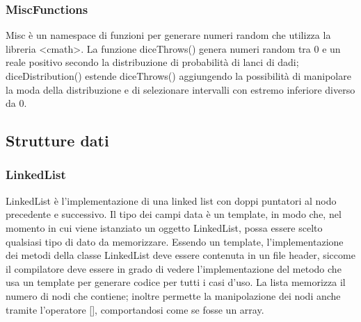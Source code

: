\documentclass[12pt]{article}
\begin{document}
\subsubsection{MiscFunctions}
    Misc è un namespace di funzioni per generare numeri random che utilizza la libreria <cmath>.
    La funzione diceThrows() genera numeri random tra 0 e un reale positivo secondo la distribuzione di probabilità di lanci di dadi; diceDistribution() estende diceThrows() aggiungendo la possibilità di manipolare la moda della distribuzione e di selezionare intervalli con estremo inferiore diverso da 0.

\subsection{Strutture dati}

\subsubsection{LinkedList}
    LinkedList è l'implementazione di una linked list con doppi puntatori al nodo precedente e successivo.
    Il tipo dei campi data è un template, in modo che, nel momento in cui viene istanziato un oggetto LinkedList, possa essere scelto qualsiasi tipo di dato da memorizzare. 
    Essendo un template, l'implementazione dei metodi della classe LinkedList deve essere contenuta in un file header, siccome il compilatore deve essere in grado di vedere l'implementazione del metodo che usa un template per generare codice per tutti i casi d'uso.
    La lista memorizza il numero di nodi che contiene; inoltre permette la manipolazione dei nodi anche tramite l'operatore [], comportandosi come se fosse un array.


\pagebreak
\end{document}
